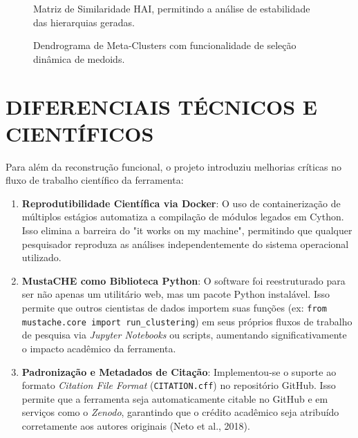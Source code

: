 \documentclass[12pt,a4paper]{article}
\begin{document}
\begin{figure}[H]
    \centering
    \caption{Matriz de Similaridade HAI, permitindo a análise de estabilidade das hierarquias geradas.}
    \label{fig:hai}
\end{figure}

\begin{figure}[H]
    \centering
    \caption{Dendrograma de Meta-Clusters com funcionalidade de seleção dinâmica de medoids.}
    \label{fig:dendrogram}
\end{figure}

\section{DIFERENCIAIS TÉCNICOS E CIENTÍFICOS}

Para além da reconstrução funcional, o projeto introduziu melhorias críticas no fluxo de trabalho científico da ferramenta:

\begin{enumerate}
    \item \textbf{Reprodutibilidade Científica via Docker}: O uso de containerização de múltiplos estágios automatiza a compilação de módulos legados em Cython. Isso elimina a barreira do "it works on my machine", permitindo que qualquer pesquisador reproduza as análises independentemente do sistema operacional utilizado.
    \item \textbf{MustaCHE como Biblioteca Python}: O software foi reestruturado para ser não apenas um utilitário web, mas um pacote Python instalável. Isso permite que outros cientistas de dados importem suas funções (ex: \texttt{from mustache.core import run_clustering}) em seus próprios fluxos de trabalho de pesquisa via \textit{Jupyter Notebooks} ou scripts, aumentando significativamente o impacto acadêmico da ferramenta.
    \item \textbf{Padronização e Metadados de Citação}: Implementou-se o suporte ao formato \textit{Citation File Format} (\texttt{CITATION.cff}) no repositório GitHub. Isso permite que a ferramenta seja automaticamente citable no GitHub e em serviços como o \textit{Zenodo}, garantindo que o crédito acadêmico seja atribuído corretamente aos autores originais (Neto et al., 2018).
\end{enumerate}
\end{document}
